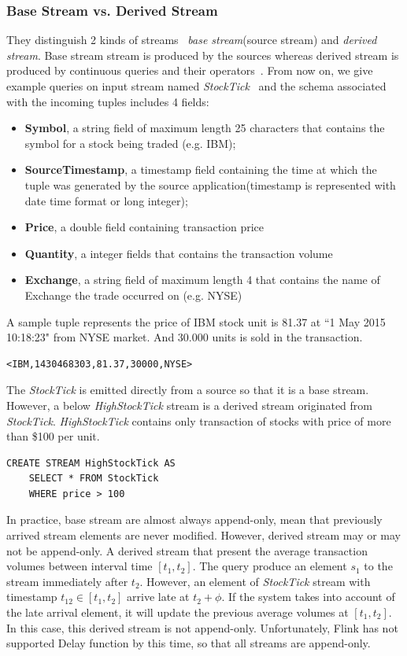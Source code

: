 \subsubsection*{Base Stream vs. Derived Stream}
They distinguish 2 kinds of streams~\citep{Kramer:2009} \textit{base stream}(source stream) and \textit{derived stream}. Base stream stream is produced by the sources whereas derived stream is produced by continuous queries and their operators~\citep{Arasu:2006}. 
From now on, we give example queries on input stream named \textit{StockTick}~\citep{StreamBaseTut} and the schema associated with the incoming tuples includes 4 fields:
\begin{itemize}
\item \textbf{Symbol}, a string field of maximum length 25 characters that contains the symbol for a stock being traded (e.g. IBM);
\item \textbf{SourceTimestamp}, a timestamp field containing the time at which the tuple was generated by the source application(timestamp is represented with date time format or long integer);
\item \textbf{Price}, a double field containing transaction price
\item \textbf{Quantity}, a integer fields that contains the transaction volume
\item \textbf{Exchange}, a string field of maximum length 4 that contains the name of Exchange the trade occurred on (e.g. NYSE)

\end{itemize}
A sample tuple represents the price of IBM stock unit is 81.37 at ``1 May 2015 10:18:23" from NYSE market. And 30.000 units is sold in the transaction. 
\begin{verbatim}
<IBM,1430468303,81.37,30000,NYSE>
\end{verbatim}

The \textit{StockTick} is emitted directly from a source so that it is a base stream. However, a below \textit{HighStockTick} stream is a derived stream originated from \textit{StockTick}. \textit{HighStockTick} contains only transaction of stocks with price of more than \$100 per unit.

\begin{verbatim}
CREATE STREAM HighStockTick AS
	SELECT * FROM StockTick 
	WHERE price > 100
\end{verbatim}

In practice, base stream are almost always append-only, mean that previously arrived stream elements are never modified. However, derived stream may or may not be append-only\cite{Golab:2010}. A derived stream that present the average transaction volumes between interval time $[t_1, t_2]$. The query produce an element $s_1$ to the stream immediately after $t_2$. However, an element of \textit{StockTick} stream with timestamp 
$t_{12} \in [t_1,t_2]$ arrive late at $t_2+\phi$. If the system takes into account of the late arrival element, it will update the previous average volumes at $[t_1, t_2]$. In this case, this derived stream is not append-only. Unfortunately, Flink has not supported Delay function by this time, so that all streams are append-only.


